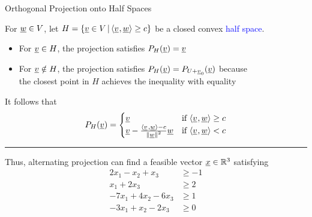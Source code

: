 \documentclass[10pt,letterpaper,english]{beamer}
\begin{document}
\begin{frame}{Orthogonal Projection onto Half Spaces}

\vspace{2mm}

For $\underline{w} \in V$, let $H = \{ \underline{v} \in V \,|\, {\langle \underline v \mskip1mu , \underline w \rangle}\geq c \}$ be a closed convex \textcolor{blue}{half space}.

\begin{itemize}
\item For $\underline v\in H$, the projection satisfies $P_{H}(\underline v)=\underline v$ 
\item For $\underline v\notin H$, the projection satisfies $P_{H}(\underline v)=P_{U+\underline v_{0}}(\underline v)$ because \\ the closest point in $H$ achieves the inequality with equality
\end{itemize}

It follows that \vspace{-2.5mm}
\begin{equation*}
P_{H}(\underline v)=\begin{cases}
\underline v & \text{if }{\langle \underline v \mskip1mu , \underline w \rangle}\geq c\\
\underline v-\frac{{\left\langle  \underline v \mskip2mu , \underline w \right\rangle} -c}{\left\Vert \underline w\right\Vert ^{2}}\underline w & \text{if }{\langle \underline v \mskip1mu , \underline w \rangle}<c
\end{cases}\label{eq:proj_ineq}
\end{equation*}

\vspace{1mm}
\hrule
\vspace{4mm}
Thus, alternating projection can find a feasible vector $\underline{x}\in \mathbb{R}^3$ satisfying \vspace{-1mm}
{\small
\begin{align*}
2x_{1}-x_{2}+x_{3} & \geq-1\\
x_{1}+2x_{3} & \geq2\\
-7x_{1}+4x_{2}-6x_{3} & \geq1\\
-3x_{1}+x_{2}-2x_{3} & \geq0
\end{align*}
}
\vspace{-3mm}

\end{frame}
\end{document}
